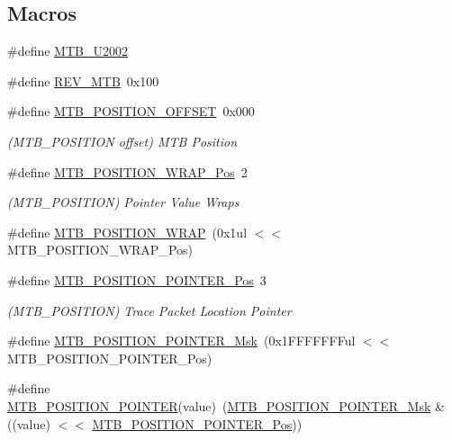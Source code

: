 \subsection*{Macros}
\begin{DoxyCompactItemize}
\item 
\#define \mbox{\hyperlink{group___s_a_m_d21___m_t_b_ga2d1f0c359b5a3e5564403203a61ad9f0}{M\+T\+B\+\_\+\+U2002}}
\item 
\#define \mbox{\hyperlink{group___s_a_m_d21___m_t_b_ga596b20f15d56213a44961489dfefafd0}{R\+E\+V\+\_\+\+M\+TB}}~0x100
\item 
\#define \mbox{\hyperlink{group___s_a_m_d21___m_t_b_gacf736a2cfd54247fce8d341e4083bc65}{M\+T\+B\+\_\+\+P\+O\+S\+I\+T\+I\+O\+N\+\_\+\+O\+F\+F\+S\+ET}}~0x000
\begin{DoxyCompactList}\small\item\em (M\+T\+B\+\_\+\+P\+O\+S\+I\+T\+I\+ON offset) M\+TB Position \end{DoxyCompactList}\item 
\#define \mbox{\hyperlink{group___s_a_m_d21___m_t_b_gae36946e901f21af399790c801131a24d}{M\+T\+B\+\_\+\+P\+O\+S\+I\+T\+I\+O\+N\+\_\+\+W\+R\+A\+P\+\_\+\+Pos}}~2
\begin{DoxyCompactList}\small\item\em (M\+T\+B\+\_\+\+P\+O\+S\+I\+T\+I\+ON) Pointer Value Wraps \end{DoxyCompactList}\item 
\#define \mbox{\hyperlink{group___s_a_m_d21___m_t_b_ga3d831001edb7b1b2b965fa994a62ae42}{M\+T\+B\+\_\+\+P\+O\+S\+I\+T\+I\+O\+N\+\_\+\+W\+R\+AP}}~(0x1ul $<$$<$ M\+T\+B\+\_\+\+P\+O\+S\+I\+T\+I\+O\+N\+\_\+\+W\+R\+A\+P\+\_\+\+Pos)
\item 
\#define \mbox{\hyperlink{group___s_a_m_d21___m_t_b_gaa28512e5fb745a251e5d1d36942f62ea}{M\+T\+B\+\_\+\+P\+O\+S\+I\+T\+I\+O\+N\+\_\+\+P\+O\+I\+N\+T\+E\+R\+\_\+\+Pos}}~3
\begin{DoxyCompactList}\small\item\em (M\+T\+B\+\_\+\+P\+O\+S\+I\+T\+I\+ON) Trace Packet Location Pointer \end{DoxyCompactList}\item 
\#define \mbox{\hyperlink{group___s_a_m_d21___m_t_b_ga013976edca9647c438955dd2fbf24ec2}{M\+T\+B\+\_\+\+P\+O\+S\+I\+T\+I\+O\+N\+\_\+\+P\+O\+I\+N\+T\+E\+R\+\_\+\+Msk}}~(0x1\+F\+F\+F\+F\+F\+F\+Ful $<$$<$ M\+T\+B\+\_\+\+P\+O\+S\+I\+T\+I\+O\+N\+\_\+\+P\+O\+I\+N\+T\+E\+R\+\_\+\+Pos)
\item 
\#define \mbox{\hyperlink{group___s_a_m_d21___m_t_b_gac83f3ecf8be77e14dace064def6cc5a4}{M\+T\+B\+\_\+\+P\+O\+S\+I\+T\+I\+O\+N\+\_\+\+P\+O\+I\+N\+T\+ER}}(value)~(\mbox{\hyperlink{group___s_a_m_d21___m_t_b_ga013976edca9647c438955dd2fbf24ec2}{M\+T\+B\+\_\+\+P\+O\+S\+I\+T\+I\+O\+N\+\_\+\+P\+O\+I\+N\+T\+E\+R\+\_\+\+Msk}} \& ((value) $<$$<$ \mbox{\hyperlink{group___s_a_m_d21___m_t_b_gaa28512e5fb745a251e5d1d36942f62ea}{M\+T\+B\+\_\+\+P\+O\+S\+I\+T\+I\+O\+N\+\_\+\+P\+O\+I\+N\+T\+E\+R\+\_\+\+Pos}}))
$$
\end{DoxyCompactItemize}
